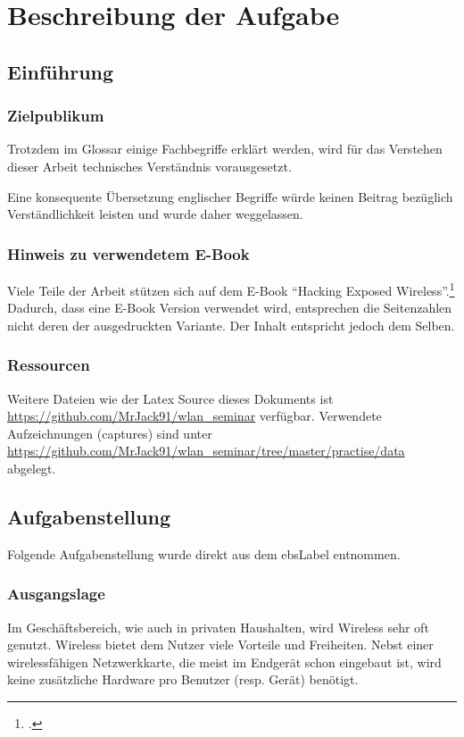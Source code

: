 \chapter{Beschreibung der Aufgabe}

\section{Einführung}
\subsection{Zielpublikum}
Trotzdem im Glossar einige Fachbegriffe erklärt werden, wird für das Verstehen dieser Arbeit technisches Verständnis vorausgesetzt.

Eine konsequente Übersetzung englischer Begriffe würde keinen Beitrag bezüglich Verständlichkeit leisten und wurde daher weggelassen.

\subsection{Hinweis zu verwendetem E-Book}
Viele Teile der Arbeit stützen sich auf dem E-Book "`Hacking Exposed Wireless"'.\footcite{WrightCache201503}
Dadurch, dass eine E-Book Version verwendet wird, entsprechen die Seitenzahlen nicht deren der ausgedruckten Variante.
Der Inhalt entspricht jedoch dem Selben.

\subsection{Ressourcen}
Weitere Dateien wie der Latex Source dieses Dokuments ist \url{https://github.com/MrJack91/wlan_seminar} verfügbar.
Verwendete Aufzeichnungen (captures) sind unter \url{https://github.com/MrJack91/wlan_seminar/tree/master/practise/data} abgelegt.

\section{Aufgabenstellung}
Folgende Aufgabenstellung wurde direkt aus dem \gls{ebsLabel} entnommen.

\subsection{Ausgangslage}
Im Geschäftsbereich, wie auch in privaten Haushalten, wird Wireless sehr oft genutzt.
Wireless bietet dem Nutzer viele Vorteile und Freiheiten. Nebst einer wirelessfähigen Netzwerkkarte, die meist im Endgerät schon eingebaut ist, wird keine zusätzliche Hardware pro Benutzer (resp. Gerät) benötigt.


